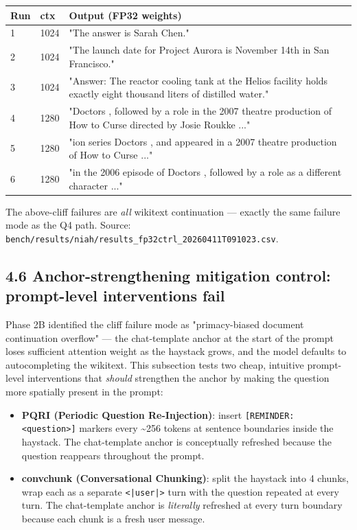 \documentclass[11pt]{article}
\begin{document}
\begin{center}
\begin{tabular}{lll}
\toprule
Run & ctx & Output (FP32 weights) \\
\midrule
1 & 1024 & "The answer is Sarah Chen." \\
2 & 1024 & "The launch date for Project Aurora is November 14th in San Francisco." \\
3 & 1024 & "Answer: The reactor cooling tank at the Helios facility holds exactly eight thousand liters of distilled water." \\
4 & 1280 & "Doctors , followed by a role in the 2007 theatre production of How to Curse directed by Josie Roukke ..." \\
5 & 1280 & "ion series Doctors , and appeared in a 2007 theatre production of How to Curse ..." \\
6 & 1280 & "in the 2006 episode of Doctors , followed by a role as a different character ..." \\
\bottomrule
\end{tabular}
\end{center}


The above-cliff failures are \textit{all} wikitext continuation — exactly the same failure mode as the Q4 path. Source: \texttt{bench/results/niah/results\_fp32ctrl\_20260411T091023.csv}.


\subsection*{4.6 Anchor-strengthening mitigation control: prompt-level interventions fail}


Phase 2B identified the cliff failure mode as "primacy-biased document continuation overflow" — the chat-template anchor at the start of the prompt loses sufficient attention weight as the haystack grows, and the model defaults to autocompleting the wikitext. This subsection tests two cheap, intuitive prompt-level interventions that \textit{should} strengthen the anchor by making the question more spatially present in the prompt:


\begin{itemize}
\item \textbf{PQRI (Periodic Question Re-Injection)}: insert \texttt{[REMINDER: <question>]} markers every \textasciitilde{}256 tokens at sentence boundaries inside the haystack. The chat-template anchor is conceptually refreshed because the question reappears throughout the prompt.
\item \textbf{convchunk (Conversational Chunking)}: split the haystack into 4 chunks, wrap each as a separate \texttt{<|user|>} turn with the question repeated at every turn. The chat-template anchor is \textit{literally} refreshed at every turn boundary because each chunk is a fresh user message.
\end{itemize}
\end{document}
